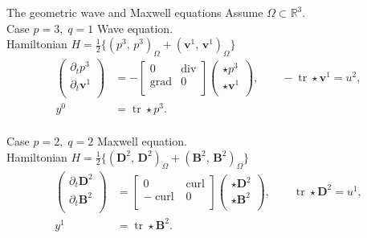 \documentclass[aspectratio=169]{beamer}
\DeclareMathOperator*{\grad}{grad}
\renewcommand{\div}{\operatorname{div}}
\DeclareMathOperator*{\curl}{curl}
\DeclareMathOperator{\tr}{tr}
\newcommand{\bbR}{\mathbb{R}}
\newcommand{\inpr}[3][]{\ensuremath{( #2, \, #3 )_{#1}}}
\begin{document}
\begin{frame}{The geometric wave and Maxwell equations}
	Assume $\Omega \subset \bbR^3$. \\
	Case $p=3, \; q=1$ Wave equation. \\
	Hamiltonian $H= \frac{1}{2}\{\inpr[\Omega]{p^3}{p^3}+ \inpr[\Omega]{\bm{v}^1}{\bm{v}^1}\}$
	\begin{equation*}
			\begin{aligned}
				\begin{pmatrix}
					\partial_t p^3 \\
					\partial_t \bm{v}^1\\
				\end{pmatrix} &= 
				-\begin{bmatrix}
					0 & \div \\
					\grad & 0 \\
				\end{bmatrix}
				\begin{pmatrix}
					\star p^3\\
					\star \bm{v}^1\\
				\end{pmatrix}, \qquad -\tr \star \bm{v}^1= u^{2}, \\
				y^{0} &= \tr \star p^3.
			\end{aligned}	
	\end{equation*}
	\vspace{.5cm}\\
	Case $p=2, \;q=2$ Maxwell equation.\\
	Hamiltonian $H= \frac{1}{2}\{\inpr[\Omega]{\bm{D}^2}{\bm{D}^2}+ \inpr[\Omega]{\bm{B}^2}{\bm{B}^2}\}$
	\begin{equation*}
		\begin{aligned}
			\begin{pmatrix}
				\partial_t \bm{D}^2 \\
				\partial_t \bm{B}^2\\
			\end{pmatrix} &= 
			\begin{bmatrix}
				0 & \curl \\
				-\curl & 0 \\
			\end{bmatrix}
			\begin{pmatrix}
				\star \bm{D}^2 \\
				\star \bm{B}^2 \\
			\end{pmatrix}, \qquad \tr \star \bm{D}^2= u^{1}, \\
			y^{1} &= \tr \star \bm{B}^2. 
		\end{aligned}	
	\end{equation*}
	
\end{frame}
\end{document}
